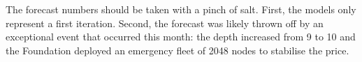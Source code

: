 The forecast numbers should be taken with a pinch of salt.
%
First, the models only represent a first iteration.
%
Second, the forecast was likely thrown off by an exceptional event that occurred this month: the depth increased from 9 to 10 and the Foundation deployed an emergency fleet of 2048 nodes to stabilise the price.
